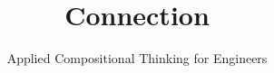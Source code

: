 \title{Connection}

\subtitle{Applied Compositional Thinking for Engineers}

\date{}


\institute[ETHZ]
{
    \begin{center}
    \end{center}
}


